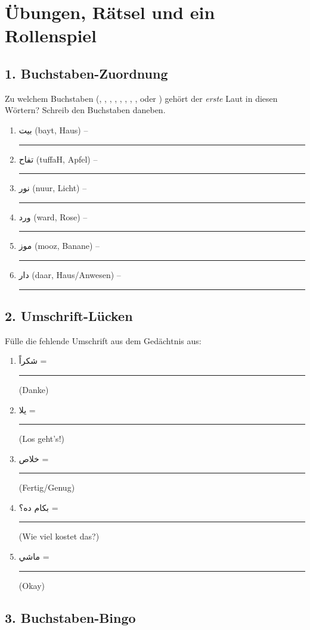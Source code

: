
\chapter{Übungen, Rätsel und ein Rollenspiel}

\section*{1. Buchstaben-Zuordnung}

Zu welchem Buchstaben (, , , ,
, , , ,  oder )
gehört der \emph{erste} Laut in diesen Wörtern? Schreib den Buchstaben daneben.

\begin{enumerate}[leftmargin=*]
\item \textarabic{\Large بيت} (bayt, Haus) -- \rule{2cm}{0.4pt}
\item \textarabic{\Large تفاح} (tuffaH, Apfel) -- \rule{2cm}{0.4pt}
\item \textarabic{\Large نور} (nuur, Licht) -- \rule{2cm}{0.4pt}
\item \textarabic{\Large ورد} (ward, Rose) -- \rule{2cm}{0.4pt}
\item \textarabic{\Large موز} (mooz, Banane) -- \rule{2cm}{0.4pt}
\item \textarabic{\Large دار} (daar, Haus/Anwesen) -- \rule{2cm}{0.4pt}
\end{enumerate}

\section*{2. Umschrift-Lücken}

Fülle die fehlende Umschrift aus dem Gedächtnis aus:

\begin{enumerate}[leftmargin=*]
\item \textarabic{\Large شكراً} = \rule{3cm}{0.4pt} (Danke)
\item \textarabic{\Large يلا} = \rule{3cm}{0.4pt} (Los geht's!)
\item \textarabic{\Large خلاص} = \rule{3cm}{0.4pt} (Fertig/Genug)
\item \textarabic{\Large بكام ده؟} = \rule{3cm}{0.4pt} (Wie viel kostet das?)
\item \textarabic{\Large ماشي} = \rule{3cm}{0.4pt} (Okay)
\end{enumerate}

\section*{3. Buchstaben-Bingo}

